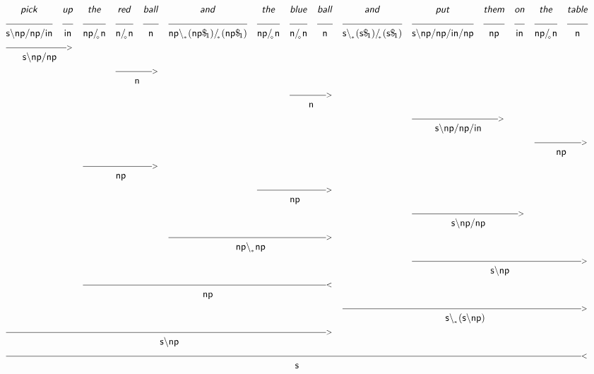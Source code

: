\documentclass{article}
\newcommand{\deriv}[2]
{  \renewcommand{\arraystretch}{.5}
$\begin{array}[t]{*{#1}{c}}
     #2
   \end{array}$ }
\newcommand{\gf}[1]{\textsf{\textsl{#1}}}
\newcommand{\cf}[1]{\mbox{\ensuremath{\cfont{#1}}}}
\newcommand{\uline}[1]
{\mc{#1}{\hrulefill} }
\newcommand{\mc}[2]
  {\multicolumn{#1}{c}{#2}}
\newcommand{\cfont}{\mathsf}
\newcommand{\bs}{\backslash}
\newcommand{\subsa}[1]{\hspace{-0.75mm}_{_{#1}}}
\newcommand{\subsb}[1]{\hspace{-0.10mm}_{_{#1}}}
\newcommand{\subs}[1]{\hspace{-0.40mm}_{#1}}
\begin{document}
\vspace{5mm}

\deriv{15}{
\gf{pick} & \gf{up} & \gf{the} & \gf{red} & \gf{ball} & \gf{and} & \gf{the} & \gf{blue} & \gf{ball} & \gf{and} & \gf{put} & \gf{them} & \gf{on} & \gf{the} & \gf{table} \\
\uline{1} & \uline{1} & \uline{1} & \uline{1} & \uline{1} & \uline{1} & \uline{1} & \uline{1} & \uline{1} & \uline{1} & \uline{1} & \uline{1} & \uline{1} & \uline{1} & \uline{1} \\
\cf{s\bs np/ np/ in} & \cf{in} & \cf{np/ \subsa{\diamond} n} & \cf{n/ \subsa{\diamond} n} & \cf{n} & \cf{np\bs \subsb{*} (np\$ \subs{1})/ \subsa{*} (np\$ \subs{1})} & \cf{np/ \subsa{\diamond} n} & \cf{n/ \subsa{\diamond} n} & \cf{n} & \cf{s\bs \subsb{*} (s\$ \subs{1})/ \subsa{*} (s\$ \subs{1})} & \cf{s\bs np/ np/ in/ np} & \cf{np} & \cf{in} & \cf{np/ \subsa{\diamond} n} & \cf{n} \\
 \mc{2} {\hrulefill_{>}} \\
 \mc{2}{\cf{s\bs np/ np}} \\
&&& \mc{2} {\hrulefill_{>}} \\
&&& \mc{2}{\cf{n}} \\
&&&&&&& \mc{2} {\hrulefill_{>}} \\
&&&&&&& \mc{2}{\cf{n}} \\
&&&&&&&&&& \mc{2} {\hrulefill_{>}} \\
&&&&&&&&&& \mc{2}{\cf{s\bs np/ np/ in}} \\
&&&&&&&&&&&&& \mc{2} {\hrulefill_{>}} \\
&&&&&&&&&&&&& \mc{2}{\cf{np}} \\
&& \mc{3} {\hrulefill_{>}} \\
&& \mc{3}{\cf{np}} \\
&&&&&& \mc{3} {\hrulefill_{>}} \\
&&&&&& \mc{3}{\cf{np}} \\
&&&&&&&&&& \mc{3} {\hrulefill_{>}} \\
&&&&&&&&&& \mc{3}{\cf{s\bs np/ np}} \\
&&&&& \mc{4} {\hrulefill_{>}} \\
&&&&& \mc{4}{\cf{np\bs \subsb{*} np}} \\
&&&&&&&&&& \mc{5} {\hrulefill_{>}} \\
&&&&&&&&&& \mc{5}{\cf{s\bs np}} \\
&& \mc{7} {\hrulefill_{<}} \\
&& \mc{7}{\cf{np}} \\
&&&&&&&&& \mc{6} {\hrulefill_{>}} \\
&&&&&&&&& \mc{6}{\cf{s\bs \subsb{*} (s\bs np)}} \\
 \mc{9} {\hrulefill_{>}} \\
 \mc{9}{\cf{s\bs np}} \\
 \mc{15} {\hrulefill_{<}} \\
 \mc{15}{\cf{s}} \\
}

\vspace{5mm}
\end{document}
